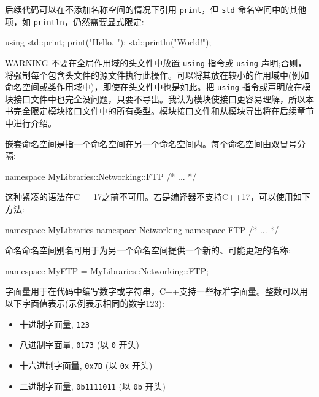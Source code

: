 后续代码可以在不添加名称空间的情况下引用 \verb|print|，但 \verb|std| 命名空间中的其他项，如 \verb|println|，仍然需要显式限定:

\begin{cpp}
using std::print;
print("Hello, ");
std::println("World!");
\end{cpp}

\begin{myWarning}{WARNING}
不要在全局作用域的头文件中放置 \verb|using| 指令或 \verb|using| 声明;否则，将强制每个包含头文件的源文件执行此操作。可以将其放在较小的作用域中(例如命名空间或类作用域中)，即使在头文件中也是如此。把 \verb|using| 指令或声明放在模块接口文件中也完全没问题，只要不导出。我认为模块使接口更容易理解，所以本书完全限定模块接口文件中的所有类型。模块接口文件和从模块导出将在后续章节中进行介绍。
\end{myWarning}


嵌套命名空间是指一个命名空间在另一个命名空间内。每个命名空间由双冒号分隔:

\begin{cpp}
namespace MyLibraries::Networking::FTP {
    /* ... */
}
\end{cpp}

这种紧凑的语法在C++17之前不可用。若是编译器不支持C++17，可以使用如下方法:

\begin{cpp}
namespace MyLibraries {
    namespace Networking {
        namespace FTP {
            /* ... */
        }
    }
}
\end{cpp}


命名命名空间别名可用于为另一个命名空间提供一个新的、可能更短的名称:

\begin{cpp}
namespace MyFTP = MyLibraries::Networking::FTP;
\end{cpp}


字面量用于在代码中编写数字或字符串，C++支持一些标准字面量。整数可以用以下字面值表示(示例表示相同的数字123):

\begin{itemize}
\item
十进制字面量, \verb|123|

\item
八进制字面量, \verb|0173| (以 \verb|0| 开头)

\item
十六进制字面量, \verb|0x7B| (以 \verb|0x| 开头)

\item
二进制字面量, \verb|0b1111011| (以 \verb|0b| 开头)
\end{itemize}

